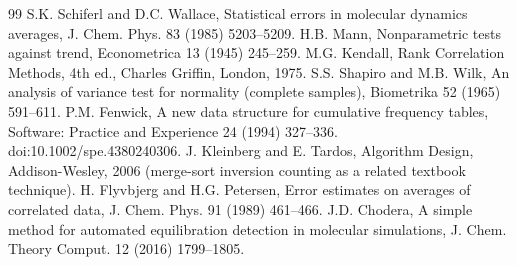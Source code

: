 \documentclass[11pt,oneside]{report}
\begin{document}
\begin{thebibliography}{99}
 S.K. Schiferl and D.C. Wallace, Statistical errors in molecular dynamics averages, J. Chem. Phys. 83 (1985) 5203--5209.
 H.B. Mann, Nonparametric tests against trend, Econometrica 13 (1945) 245--259.
 M.G. Kendall, Rank Correlation Methods, 4th ed., Charles Griffin, London, 1975.
 S.S. Shapiro and M.B. Wilk, An analysis of variance test for normality (complete samples), Biometrika 52 (1965) 591--611.
 P.M. Fenwick, A new data structure for cumulative frequency tables, Software: Practice and Experience 24 (1994) 327--336. doi:10.1002/spe.4380240306.
 J. Kleinberg and E. Tardos, Algorithm Design, Addison-Wesley, 2006 (merge-sort inversion counting as a related textbook technique).
 H. Flyvbjerg and H.G. Petersen, Error estimates on averages of correlated data, J. Chem. Phys. 91 (1989) 461--466.
 J.D. Chodera, A simple method for automated equilibration detection in molecular simulations, J. Chem. Theory Comput. 12 (2016) 1799--1805.
\end{thebibliography}
\end{document}
